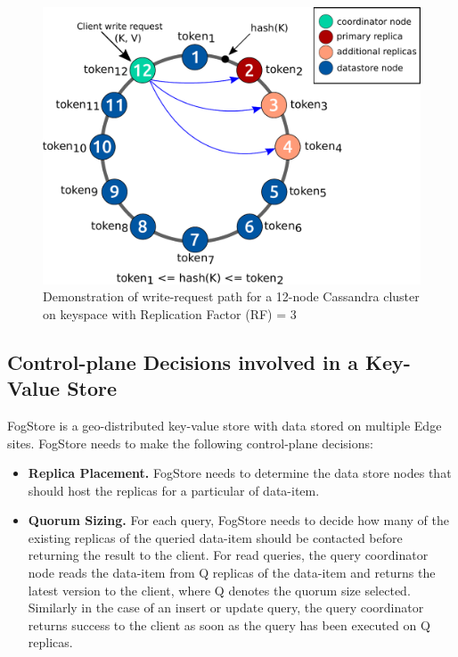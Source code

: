 \begin{figure}
\centering
\includegraphics[width=0.7\linewidth]{figures/fogstore/basics/hashring.pdf}
\caption{Demonstration of write-request path for a 12-node
Cassandra cluster on keyspace with Replication Factor (RF)
= 3}
\label{fig:hashring_replication}

\end{figure}

\subsection{Control-plane Decisions involved in a Key-Value Store}
FogStore is a geo-distributed key-value store with data stored on multiple Edge sites. FogStore needs to make the following control-plane decisions:
\begin{itemize}
\item \textbf{Replica Placement.} FogStore needs to determine the data store nodes that should host the replicas for a particular of data-item.
\item \textbf{Quorum Sizing. } For each query, FogStore needs to decide how many of the existing replicas of the queried data-item should be contacted before returning the result to the client. For read queries, the query coordinator node reads the data-item from Q replicas of the data-item and returns the latest version to the client, where Q denotes the quorum size selected. Similarly in the case of an insert or update query, the query coordinator returns success to the client as soon as the query has been executed on Q replicas.
\end{itemize}

